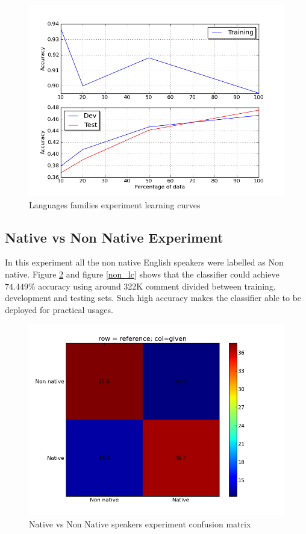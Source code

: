 \documentclass[11pt]{article}
\begin{document}
\begin{figure}[htp]
\centering
\includegraphics[scale=0.45]{family_lc.png}
\caption{Languages families experiment learning curves}
\label{fam_lc}
\end{figure}

\subsection{Native vs Non Native Experiment}
In this experiment all the non native English speakers were labelled as Non native. Figure \ref{non_cfm} and figure \ref{non_lc} shows that the classifier could achieve $74.449\%$ accuracy using around 322K comment divided between training, development and testing sets. Such high accuracy makes the classifier able to be deployed for practical usages.


\begin{figure}[htp]
\centering
\includegraphics[scale=0.45]{native_cfm.png}
\caption{Native vs Non Native speakers experiment confusion matrix}
\label{non_cfm}
\end{figure}
\end{document}
